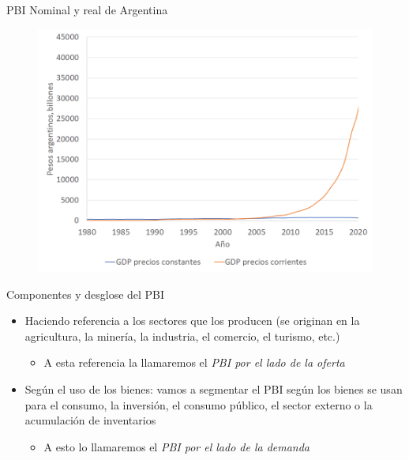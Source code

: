 \documentclass{beamer}
\begin{document}
\begin{frame}{PBI Nominal y real de Argentina}
    \begin{figure} [H]   \includegraphics[scale=1.1]{Figures/G2B.png}
\end{figure}
\end{frame}


\begin{frame}{Componentes y desglose del PBI}
    \begin{itemize}
    \item Haciendo referencia a los sectores que los producen (se originan en la agricultura, la minería, la industria, el comercio, el turismo, etc.) 
        \begin{itemize} \vspace{1mm}
            \item A esta referencia la llamaremos el \textit{PBI por el lado de la oferta}
        \end{itemize} \vspace{2mm}
     \item Según el uso de los bienes: vamos a segmentar el PBI según los bienes se usan para el consumo, la  inversión, el consumo público, el sector externo o la acumulación de inventarios \vspace{1mm}
     \begin{itemize}
            \item A esto lo llamaremos el \textit{PBI por el lado de la demanda}
        \end{itemize}
\end{itemize}
\end{frame}
\end{document}
